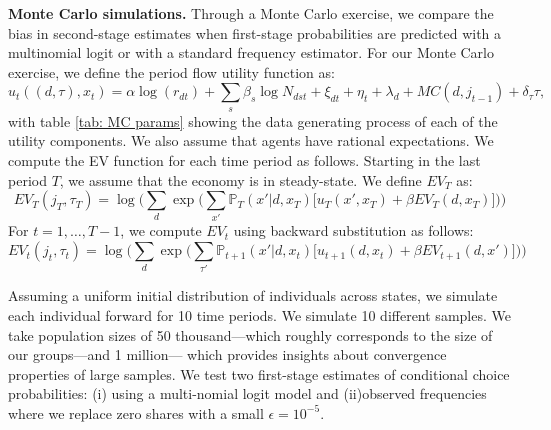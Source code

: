 \documentclass[11pt]{article}
\newcommand{\Prob}{\mathbb{P}}
\newcommand{\Paragraph}{\vspace{0.1cm}\noindent\textbf}
\begin{document}
\Paragraph{Monte Carlo simulations.} Through a Monte Carlo exercise, we compare the bias in second-stage estimates when first-stage probabilities are predicted with a multinomial logit or with a standard frequency estimator. For our Monte Carlo exercise, we define the period flow utility function as:
\begin{equation*}
    u_{t}((d,\tau),x_t) =  \alpha \log(r_{dt}) + \sum_s   \beta_s \log N_{dst}
    + \xi_{dt} + \eta_t + \lambda_d + MC(d,j_{t-1}) + \delta_{\tau} \tau,
\end{equation*}
with table \ref{tab: MC params} showing the data generating process of each of the utility components. We also assume that agents have rational expectations. We compute the EV function for each time period as follows. Starting in the last period $T$, we assume that the economy is in steady-state. We define $EV_T$ as:
\begin{equation}
    EV_T(j_T,\tau_T) = \log \Bigg( \sum_d \exp \Big( \sum_{x'} \Prob_T(x'|d,x_T) \big[ u_T(x',x_T) + \beta EV_{T}(d,x_T) \big] \Big) \Bigg)
\end{equation}
For $t=1,\dots,T-1$, we compute $EV_t$ using backward substitution as follows:
\begin{equation}
    EV_t(j_t,\tau_t) = \log \Big( \sum_{d} \exp \big( \sum_{\tau'} \Prob_{t+1}(x'|d,x_t) \big[ u_{t+1}(d,x_t) + \beta EV_{t+1}(d,x') \big] \big) \Big)
\end{equation}

Assuming a uniform initial distribution of individuals across states, we simulate each individual forward for 10 time periods. We simulate 10 different samples. We take population sizes of 50 thousand---which roughly corresponds to the size of our groups---and 1 million--- which provides insights about convergence properties of large samples. We test two first-stage estimates of conditional choice probabilities: (i) using a multi-nomial logit model and (ii)observed frequencies where we replace zero shares with a small $\epsilon = 10^{-5}$. 
\end{document}
